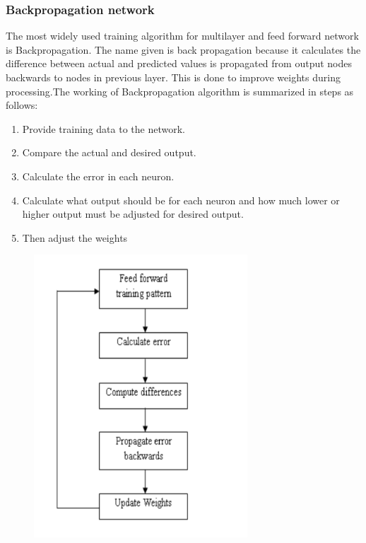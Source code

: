 \documentclass{book}
\begin{document}
  	\subsubsection{Backpropagation network}
  	The most widely used training algorithm for multilayer and feed forward network is
  	Backpropagation. The name given is back propagation because it calculates the difference between actual and predicted values is propagated from output nodes backwards to nodes in previous layer. This is done to improve weights during processing.The working of Backpropagation algorithm is summarized in steps as follows:
  	\begin{enumerate}
  		\item Provide training data to the network.
  		\item Compare the actual and desired output.
  		\item Calculate the error in each neuron. 
  		\item Calculate what output should be for each neuron and how much lower or
  		higher output must be adjusted for desired output.
  		\item Then adjust the weights
  	\end{enumerate}
  
  \begin{figure}
  	\begin{center}
  			\includegraphics[width=8cm]{images/backpropogation.png}
  	\end{center}
  \end{figure}
\end{document}
